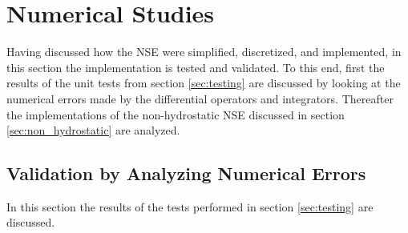 \chapter{Numerical Studies}
Having discussed how the NSE were simplified, discretized, and implemented, in this section the implementation is tested and validated.
To this end, first the results of the unit tests from section \ref{sec:testing} are discussed by looking at the numerical errors made by the differential operators and integrators.
Thereafter the implementations of the non-hydrostatic NSE discussed in section \ref{sec:non_hydrostatic} are analyzed.

\section{Validation by Analyzing Numerical Errors}
In this section the results of the tests performed in section \ref{sec:testing} are discussed.

